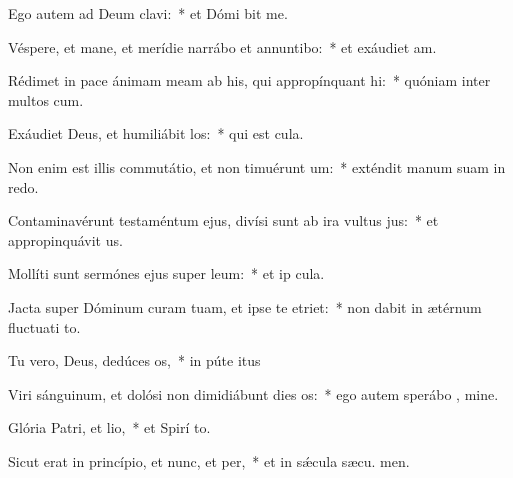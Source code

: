 \item Ego autem ad Deum clavi:~* et Dómi bit me.
\item Véspere, et mane, et merídie narrábo et annuntibo:~* et exáudiet  am.
\item Rédimet in pace ánimam meam ab his, qui appropínquant hi:~* quóniam inter multos  cum.
\item Exáudiet Deus, et humiliábit los:~* qui est  cula.
\item Non enim est illis commutátio, et non timuérunt um:~* exténdit manum suam in redo.
\item Contaminavérunt testaméntum ejus, divísi sunt ab ira vultus jus:~* et appropinquávit  us.
\item Mollíti sunt sermónes ejus super leum:~* et ip  cula.
\item Jacta super Dóminum curam tuam, et ipse te etriet:~* non dabit in ætérnum fluctuati to.
\item Tu vero, Deus, dedúces os,~* in púte itus
\item Viri sánguinum, et dolósi non dimidiábunt dies os:~* ego autem sperábo  , mine.
\item Glória Patri, et lio,~* et Spirí to.
\item Sicut erat in princípio, et nunc, et per,~* et in sǽcula sæcu. men.
